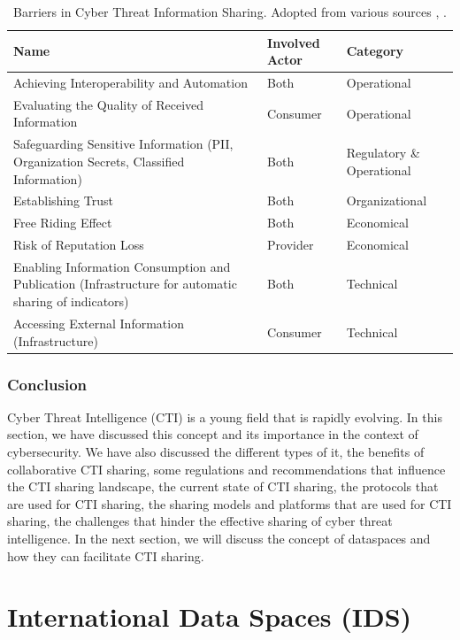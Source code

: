 \begin{table}[ht]
    \centering
    \begin{tabular}{| m{6cm} | m{3cm} | m{3cm} |}
    \hline
    \textbf{Name} & \textbf{Involved Actor} & \textbf{Category} \\
    \hline
    Achieving Interoperability and Automation & Both & Operational \\
    \hline
    Evaluating the Quality of Received Information & Consumer & Operational \\
    \hline
    Safeguarding Sensitive Information (PII, Organization Secrets, Classified Information) & Both & Regulatory \& Operational \\
    \hline
    Establishing Trust & Both & Organizational \\
    \hline
    Free Riding Effect & Both & Economical \\
    \hline
    Risk of Reputation Loss & Provider & Economical \\
    \hline
    Enabling Information Consumption and Publication (Infrastructure for automatic sharing of indicators) & Both & Technical \\
    \hline
    Accessing External Information (Infrastructure) & Consumer & Technical \\
    \hline
    \end{tabular}
    \caption{Barriers in Cyber Threat Information Sharing. Adopted from various sources \cite{johnson_guide_2016}, \cite{zibak_cyber_2019}.}
    \label{table:barriers}
\end{table}

\subsubsection{Conclusion}
Cyber Threat Intelligence (CTI) is a young field that is rapidly evolving. In this section, we have discussed this concept and its importance in the context of cybersecurity. We have also discussed the different types of it, the benefits of collaborative CTI sharing, some regulations and recommendations that influence the CTI sharing landscape, the current state of CTI sharing, the protocols that are used for CTI sharing, the sharing models and platforms that are used for CTI sharing, the challenges that hinder the effective sharing of cyber threat intelligence. In the next section, we will discuss the concept of dataspaces and how they can facilitate CTI sharing.

\section{International Data Spaces (IDS)}
